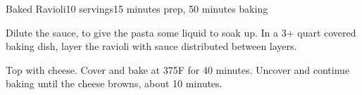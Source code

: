 \documentclass[../Cookbook.tex]{subfiles}
\begin{document}
\begin{recipe}[BakedRavioli]{Baked Ravioli}{10 servings}{15 minutes prep, 50 minutes baking}

Dilute the sauce, to give the pasta some liquid to soak up.
In a 3+ quart covered baking dish, layer the ravioli with sauce distributed between layers.

Top with cheese.
Cover and bake at 375\0F for 40 minutes.
Uncover and continue baking until the cheese browns, about 10 minutes.

\end{recipe}
\end{document}
